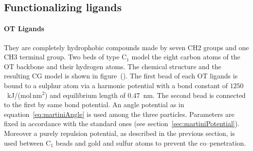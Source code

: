 
\subsection{Functionalizing ligands}

\paragraph{\textbf{OT Ligands}} They are completely hydrophobic compounds made by seven \ac{CH2} groups and one \ac{CH3} terminal group. Two \martini beds of type C$_1$ model the eight carbon atoms of the \ac{OT} backbone and their hydrogen atoms. The chemical structure and the resulting \ac{CG} \martini model is shown in figure~(). The first bead of each \ac{OT} ligands is bound to a sulphur atom via a harmonic potential with a bond constant of $1250$~kJ/(mol\,nm$^2$) and equilibrium length of $0.47$~nm. The second bead is connected to the first by same bond potential. An angle potential as in equation~\eqref{eq:martiniAngle} is used among the three particles. Parameters are fixed in accordance with the standard \martini ones (see section~\ref{sec:martiniPotential}). Moreover a purely repulsion potential, as described in the previous section, is used between C$_1$ beads and gold and sulfur atoms to prevent the co--penetration.

